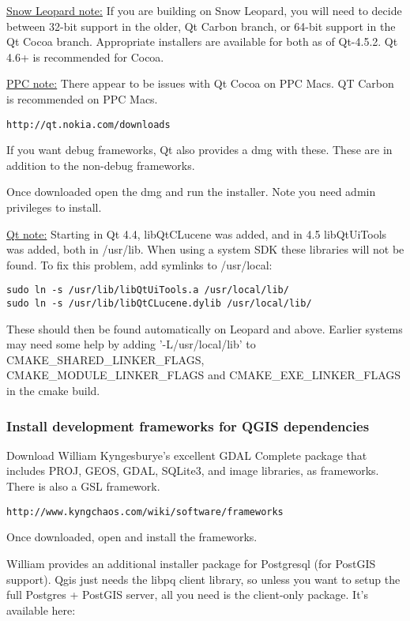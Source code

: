 \underline{Snow Leopard note:} If you are building on Snow Leopard, you will need to
decide between 32-bit support in the older, Qt Carbon branch, or 64-bit
support in the Qt Cocoa branch. Appropriate installers are available for both
as of Qt-4.5.2.  Qt 4.6+ is recommended for Cocoa.

\underline{PPC note:} There appear to be issues with Qt Cocoa on PPC Macs.  QT Carbon
is recommended on PPC Macs.

\begin{verbatim}
http://qt.nokia.com/downloads
\end{verbatim}

If you want debug frameworks, Qt also provides a dmg with these.  These are in
addition to the non-debug frameworks.

Once downloaded open the dmg and run the installer. Note you need admin
privileges to install.

\underline{Qt note:} Starting in Qt 4.4, libQtCLucene was added, and in 4.5
libQtUiTools was added, both in /usr/lib.  When using a system SDK
these libraries will not be found.  To fix this problem,
add symlinks to /usr/local:

\begin{verbatim}
sudo ln -s /usr/lib/libQtUiTools.a /usr/local/lib/
sudo ln -s /usr/lib/libQtCLucene.dylib /usr/local/lib/
\end{verbatim}

These should then be found automatically on Leopard and above.  Earlier systems
may need some help by adding '-L/usr/local/lib' to CMAKE\_SHARED\_LINKER\_FLAGS,
CMAKE\_MODULE\_LINKER\_FLAGS and CMAKE\_EXE\_LINKER\_FLAGS in the cmake build.

\hypertarget{toc20}{}
\subsubsection{Install development frameworks for QGIS dependencies}
Download William Kyngesburye's excellent GDAL Complete package that includes
PROJ, GEOS, GDAL, SQLite3, and image libraries, as frameworks.  There is also
a GSL framework.

\begin{verbatim}
http://www.kyngchaos.com/wiki/software/frameworks
\end{verbatim}

Once downloaded, open and install the frameworks.

William provides an additional installer package for Postgresql (for PostGIS support).
Qgis just needs the libpq client library, so unless you want to setup the full
Postgres + PostGIS server, all you need is the client-only package.
It's available here:

